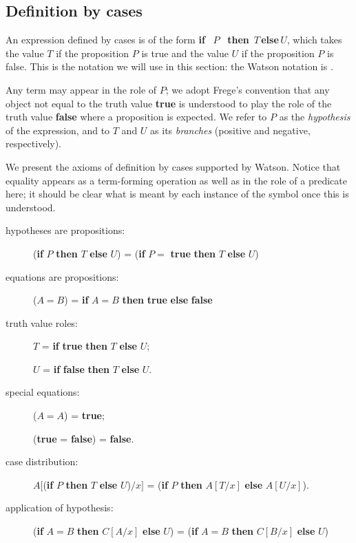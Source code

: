 \documentclass{kluwer}
\begin{document}
\begin{article}
\subsection{Definition by cases}

An expression defined by cases is of the form {\bf if} \, $P$ \,{\bf
then} \,$T$\,{\bf else}\,$U$, which takes the value $T$ if the
proposition $P$ is true and the value $U$ if the proposition $P$ is
false.  This is the notation we will use in this section: the Watson
notation is .

Any term may appear in the role of $P$; we adopt Frege's convention
that any object not equal to the truth value {\bf true} is understood
to play the role of the truth value {\bf false} where a proposition is
expected.  We refer to $P$ as the {\em hypothesis\/} of the
expression, and to $T$ and $U$ as its {\em branches\/} (positive and
negative, respectively).

We present the axioms of definition by cases supported by Watson.
Notice that equality appears as a term-forming operation as well as in
the role of a predicate here; it should be clear what is meant by each
instance of the symbol once this is understood.

\begin{description}

\item [hypotheses are propositions:] ({\bf if} $P$ {\bf
then} $T$ {\bf else} $U$) = ({\bf if} $P =$ {\bf true} {\bf
then} $T$ {\bf else} $U$)

\item [equations are propositions:] ($A = B$) = {\bf if} $A = B$ {\bf
then} {\bf true} {\bf else} {\bf false}

\item [truth value roles:] $T$ = {\bf if} {\bf true} {\bf
then} $T$ {\bf else} $U$; 

$U$ = {\bf if} {\bf false} {\bf then} $T$
{\bf else} $U$.

\item [special equations:] ($A=A$) = {\bf true}; 

({\bf true} = {\bf false}) = {\bf false}.

\item [case distribution:]  $A[$({\bf if} $P$ {\bf
then} $T$ {\bf else} $U$)$/x]$ = ({\bf if} $P$ {\bf
then} $A[T/x]$ {\bf else} $A[U/x]$).

\item [application of hypothesis:] ({\bf if} $A = B$ {\bf
then} $C[A/x]$ {\bf else} $U$) = ({\bf if} $A = B$ {\bf
then} $C[B/x]$ {\bf else} $U$)


\end{description}
\end{article}
\end{document}
